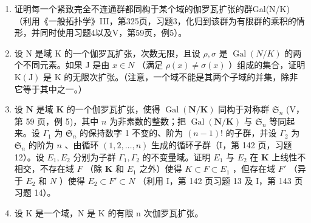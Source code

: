 \begin{enumerate}
\def\labelenumi{\arabic{enumi})}
\setcounter{enumi}{4}
\item
  证明每一个紧致完全不连通群都同构于某个域的伽罗瓦扩张的群Gal(N/K)（利用《一般拓扑学》III，第325页，习题3，化归到该群为有限群的乘积的情形，并同时使用习题4以及V，第59页，例5）。
\item
  设 N 是域 K 的一个伽罗瓦扩张，次数无限，且设 \(\rho, \sigma\) 是 \(\operatorname{Gal}(N/K)\) 的两个不同元素。如果 J 是由 \(x \in N\) （满足 \(\rho(x) \neq \sigma(x)\) ）组成的集合，证明 \(\mathrm{K}(\mathrm{J})\) 是 K 的无限次扩张。（注意，一个域不能是其两个子域的并集，除非它等于其中之一。）
\item
  设 \(\mathbf{N}\) 是域 \(\mathbf{K}\) 的一个伽罗瓦扩张，使得 \(\operatorname{Gal}(\mathbf{N} / \mathbf{K})\) 同构于对称群 \(\mathfrak{S}_n\) (V，第 59 页，例 5)，其中 \(n\) 为非素数的整数；把 \(\operatorname{Gal}(\mathbf{N} / \mathbf{K})\) 与 \(\mathfrak{S}_n\) 等同起来。设 \(\Gamma_1\) 为 \(\mathfrak{S}_n\) 的保持数字 1 不变的、阶为 \((n - 1)!\) 的子群，并设 \(\Gamma_2\) 为 \(\mathfrak{S}_n\) 的阶为 \(n\) 、由循环 \((1, 2, \ldots, n)\) 生成的循环子群（I，第 142 页，习题 12）。设 \(E_1, E_2\) 分别为子群 \(\Gamma_1, \Gamma_2\) 的不变量域。证明 \(E_1\) 与 \(E_2\) 在 \(\mathbf{K}\) 上线性不相交，不存在域 \(F\) （除 \(\mathbf{K}\) 和 \(E_1\) 之外）使得 \(K \subset F \subset E_1\) ，但存在域 \(F'\) （异于 \(E_2\) 和 \(N\) ）使得 \(E_2 \subset F' \subset N\) （利用 I，第 142 页习题 13 及 I，第 143 页习题 14）。
\item
  设 K 是一个域，N 是 K 的有限 n 次伽罗瓦扩张。
\end{enumerate}


